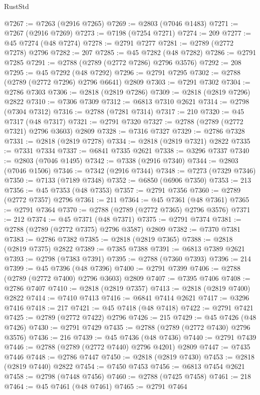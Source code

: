 \begin{lexlean}{RustStd}
\begin{coremodule}
@7267 := @7263 (@2916 @7265)
@7269 := @2803 (@7046 @1483)
@7271 := @7267 (@2916 @7269)
@7273 := @7198 (@7254 @7271)
@7274 := 209
@7277 := @45 @7274 (@48 @7274)
@7278 := @2791 @7277
@7281 := @2789 (@2772 @7278) @2796
@7282 := 207
@7285 := @45 @7282 (@48 @7282)
@7286 := @2791 @7285
@7291 := @2788 (@2789 (@2772 @7286) @2796 @3576)
@7292 := 208
@7295 := @45 @7292 (@48 @7292)
@7296 := @2791 @7295
@7302 := @2788 (@2789 (@2772 @7296) @2796 @6641) @2809
@7303 := @7291 @7302
@7304 := @2786 @7303
@7306 := @2818 (@2819 @7286)
@7309 := @2818 (@2819 @7296) @2822
@7310 := @7306 @7309
@7312 := @6813 @7310 @2621
@7314 := @2798 (@7304 @7312)
@7316 := @2788 (@7281 @7314)
@7317 := 210
@7320 := @45 @7317 (@48 @7317)
@7321 := @2791 @7320
@7327 := @2788 (@2789 (@2772 @7321) @2796 @3603) @2809
@7328 := @7316 @7327
@7329 := @2786 @7328
@7331 := @2818 (@2819 @7278)
@7334 := @2818 (@2819 @7321) @2822
@7335 := @7331 @7334
@7337 := @6841 @7335 @2621
@7338 := @3296 @7337
@7340 := @2803 (@7046 @1495)
@7342 := @7338 (@2916 @7340)
@7344 := @2803 (@7046 @1506)
@7346 := @7342 (@2916 @7344)
@7348 := @7273 (@7329 @7346)
@7350 := @7133 (@7189 @7348)
@7352 := @6850 (@6906 @7350)
@7353 := 213
@7356 := @45 @7353 (@48 @7353)
@7357 := @2791 @7356
@7360 := @2789 (@2772 @7357) @2796
@7361 := 211
@7364 := @45 @7361 (@48 @7361)
@7365 := @2791 @7364
@7370 := @2788 (@2789 (@2772 @7365) @2796 @3576)
@7371 := 212
@7374 := @45 @7371 (@48 @7371)
@7375 := @2791 @7374
@7381 := @2788 (@2789 (@2772 @7375) @2796 @3587) @2809
@7382 := @7370 @7381
@7383 := @2786 @7382
@7385 := @2818 (@2819 @7365)
@7388 := @2818 (@2819 @7375) @2822
@7389 := @7385 @7388
@7391 := @6813 @7389 @2621
@7393 := @2798 (@7383 @7391)
@7395 := @2788 (@7360 @7393)
@7396 := 214
@7399 := @45 @7396 (@48 @7396)
@7400 := @2791 @7399
@7406 := @2788 (@2789 (@2772 @7400) @2796 @3603) @2809
@7407 := @7395 @7406
@7408 := @2786 @7407
@7410 := @2818 (@2819 @7357)
@7413 := @2818 (@2819 @7400) @2822
@7414 := @7410 @7413
@7416 := @6841 @7414 @2621
@7417 := @3296 @7416
@7418 := 217
@7421 := @45 @7418 (@48 @7418)
@7422 := @2791 @7421
@7425 := @2789 (@2772 @7422) @2796
@7426 := 215
@7429 := @45 @7426 (@48 @7426)
@7430 := @2791 @7429
@7435 := @2788 (@2789 (@2772 @7430) @2796 @3576)
@7436 := 216
@7439 := @45 @7436 (@48 @7436)
@7440 := @2791 @7439
@7446 := @2788 (@2789 (@2772 @7440) @2796 @4201) @2809
@7447 := @7435 @7446
@7448 := @2786 @7447
@7450 := @2818 (@2819 @7430)
@7453 := @2818 (@2819 @7440) @2822
@7454 := @7450 @7453
@7456 := @6813 @7454 @2621
@7458 := @2798 (@7448 @7456)
@7460 := @2788 (@7425 @7458)
@7461 := 218
@7464 := @45 @7461 (@48 @7461)
@7465 := @2791 @7464

\end{coremodule}
\end{lexlean}
